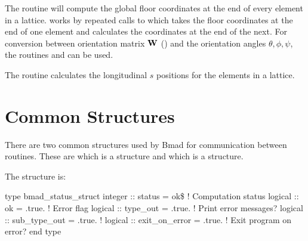 
The routine  will compute the
global floor coordinates at the end of every element in a lattice.
 works by repeated calls to  which
takes the floor coordinates at the end of one element and calculates
the coordinates at the end of the next. For conversion between
orientation matrix ${\bf W}$ () and the orientation
angles $\theta, \phi, \psi$, the routines 
and  can be used.

The routine  calculates the longitudinal $s$ positions for
the elements in a lattice.

\section{Common Structures}
\label{s:common.struct}


There are two common structures used by Bmad for communication between
routines. These are  which is a 
structure and  which is a 
structure.


The  structure is:
\begin{example}
type bmad_status_struct
  integer :: status         = ok\$     ! Computation status 
  logical :: ok             = .true.   ! Error flag
  logical :: type_out       = .true.   ! Print error messages?
  logical :: sub_type_out   = .true.   ! 
  logical :: exit_on_error  = .true.   ! Exit program on error?
end type
\end{example}




